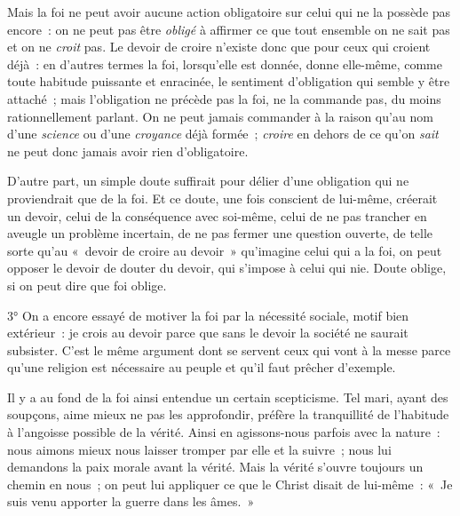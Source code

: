 \documentclass[french,twoside]{book} %
\begin{document}
Mais la foi ne peut avoir aucune action obligatoire sur celui qui ne la possède pas encore : on ne peut pas être \emph{obligé} à affirmer ce que tout ensemble on ne sait pas et on ne \emph{croit} pas. Le devoir de croire n’existe donc que pour ceux qui croient déjà : en d’autres termes la foi, lorsqu’elle est donnée, donne elle-même, comme toute habitude puissante et enracinée, le sentiment d’obligation qui semble y être attaché ; mais l’obligation ne précède pas la foi, ne la commande pas, du moins rationnellement parlant. On ne peut jamais commander à la raison qu’au nom d’une \emph{science} ou d’une \emph{croyance} déjà formée ; \emph{croire} en dehors de ce qu’on \emph{sait} ne peut donc jamais avoir rien d’obligatoire.\par
D’autre part, un simple doute suffirait pour délier d’une obligation qui ne proviendrait que de la foi. Et ce doute, une fois conscient de lui-même, créerait un devoir, celui de la conséquence avec soi-même, celui de ne pas trancher en aveugle un problème incertain, de ne pas fermer une question ouverte, de telle sorte qu’au « devoir de croire au devoir » qu’imagine celui qui a la foi, on peut opposer le devoir de douter du devoir, qui s’impose à celui qui nie. Doute oblige, si on peut dire que foi oblige.\par
3° On a encore essayé de motiver la foi par la nécessité sociale, motif bien extérieur : je crois au devoir parce que sans le devoir la société ne saurait subsister. C’est le même argument dont se servent ceux qui vont à la messe parce qu’une religion est nécessaire au peuple et qu’il faut prêcher d’exemple.\par
Il y a au fond de la foi ainsi entendue un certain scepticisme. Tel mari, ayant des soupçons, aime mieux ne pas les approfondir, préfère la tranquillité de l’habitude à l’angoisse possible de la vérité. Ainsi en agissons-nous parfois avec la nature : nous aimons mieux nous laisser tromper par elle et la suivre ; nous lui demandons la paix morale avant la vérité. Mais la vérité s’ouvre toujours un chemin en nous ; on peut lui appliquer ce que le Christ disait de lui-même : « Je suis venu apporter la guerre dans les âmes. »\par
\end{document}

